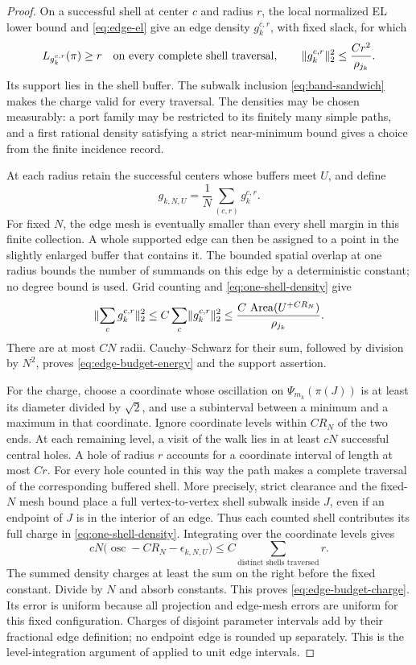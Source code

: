 \begin{proof}
On a successful shell at center \(c\) and radius \(r\), the local
normalized EL lower bound and \eqref{eq:edge-el} give an edge density
\(g_k^{c,r}\), with fixed slack, for which
\begin{equation}\label{eq:one-shell-density}
 L_{g_k^{c,r}}(\pi)\ge r
 \quad\hbox{on every complete shell traversal},\qquad
 \lVert g_k^{c,r}\rVert_2^2\le \frac{Cr^2}{\rho_{j_k}}.
\end{equation}
Its support lies in the shell buffer.  The subwalk inclusion
\eqref{eq:band-sandwich} makes the charge valid for every traversal.
The densities may be chosen measurably: a port family may be restricted
to its finitely many simple paths, and a first rational density satisfying
a strict near-minimum bound gives a choice from the finite incidence
record.

At each radius retain the successful centers whose buffers meet \(U\),
and define
\[
 g_{k,N,U}=\frac1N\sum_{(c,r)}g_k^{c,r}.
\]
For fixed \(N\), the edge mesh is eventually smaller than every shell
margin in this finite collection.  A whole supported edge can then be
assigned to a point in the slightly enlarged buffer that contains it.
The bounded spatial overlap at one radius bounds the number of summands
on this edge by a deterministic constant; no degree bound is used.
Grid counting and \eqref{eq:one-shell-density} give
\[
 \lVert \sum_c g_k^{c,r}\rVert_2^2
 \le C\sum_c\lVert g_k^{c,r}\rVert_2^2
 \le \frac{C\,\operatorname{Area}(U^{+CR_N})}{\rho_{j_k}}.
\]
There are at most \(CN\) radii.  Cauchy--Schwarz for their sum, followed
by division by \(N^2\), proves \eqref{eq:edge-budget-energy} and the
support assertion.

For the charge, choose a coordinate whose oscillation on \(\Psi_{m_k}(\pi(J))\)
is at least its diameter divided by \(\sqrt2\), and use a subinterval
between a minimum and a maximum in that coordinate.  Ignore coordinate
levels within \(CR_N\) of the two ends.  At each remaining level, a visit
of the walk lies in at least \(cN\) successful central holes.  A hole of
radius \(r\) accounts for a coordinate interval of length at most \(Cr\).
For every hole counted in this way the path makes a complete traversal of
the corresponding buffered shell.  More precisely, strict clearance and
the fixed-\(N\) mesh bound place a full vertex-to-vertex shell subwalk
inside \(J\), even if an endpoint of \(J\) is in the interior of an edge.
Thus each counted shell contributes its full charge in
\eqref{eq:one-shell-density}.  Integrating over the coordinate levels gives
\[
 cN\bigl(\operatorname{osc}-CR_N-\epsilon_{k,N,U}\bigr)
 \le C\sum_{\text{distinct shells traversed}}r .
\]
The summed density charges at least the sum on the right before the fixed
constant.  Divide by \(N\) and absorb constants.  This proves
\eqref{eq:edge-budget-charge}.  Its error is uniform because all projection
and edge-mesh errors are uniform for this fixed configuration.  Charges
of disjoint parameter intervals add by their fractional edge definition;
no endpoint edge is rounded up separately.  This is the level-integration
argument of \cite[Section~8]{C} applied to unit edge intervals.
\end{proof}

